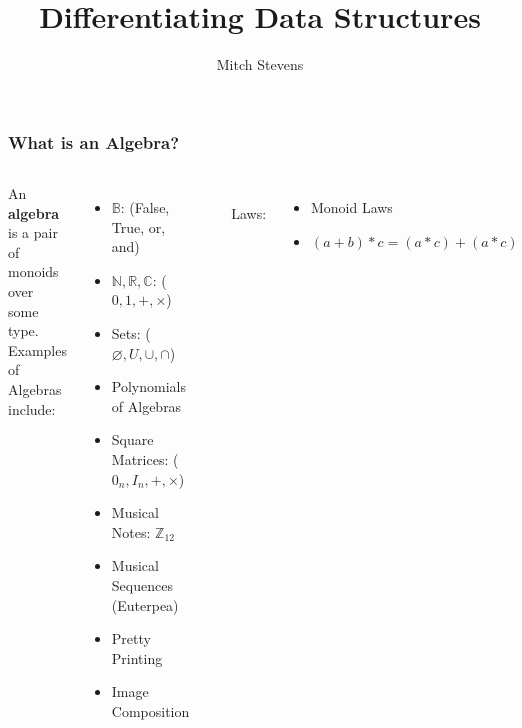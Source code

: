\documentclass[10pt]{beamer}
\title{Differentiating Data Structures}
\date{}
\author{Mitch Stevens}
\begin{document}
 
\frame{\titlepage}

\begin{frame}[fragile] 
    \frametitle{What is an Algebra?}
    \begin{columns}[c] %
	An \textbf{algebra} is a pair of monoids over some type. \\
    
    Examples of Algebras include: \\
    \begin{itemize}
        \item $\mathbb{B}$: (False, True, or, and)
        \item $\mathbb{N}, \mathbb{R}, \mathbb{C}$: ($ 0, 1, +, \times $)
        \item Sets: ($ \varnothing, U, \cup, \cap $)
        \item Polynomials of Algebras
        \item Square Matrices: ($ 0_n, I_n, +, \times $)
        \item Musical Notes: $\mathbb{Z}_{12}$
        \item Musical Sequences (Euterpea)
        \item Pretty Printing
        \item Image Composition
    \end{itemize}

    \begin{lstlisting}[language=Haskell]
class Alg a where
  zero :: a
  one :: a
  (+) :: a -> a -> a
  (*) :: a -> a -> a
    \end{lstlisting} \\
    Laws: \\
    \begin{itemize}
        \item Monoid Laws
        \item $(a+b)*c = (a*c)+(a*c)$
    \end{itemize}

    \end{columns}
\end{frame}
\end{document}
